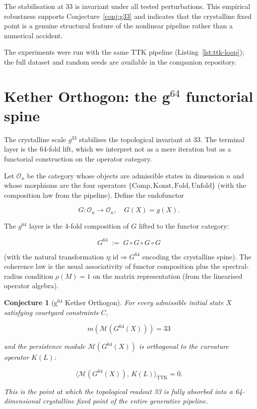 \documentclass[12pt, oneside]{book}
\theoremstyle{plain}
\newtheorem{conjecture}[theorem]{Conjecture}
\theoremstyle{definition}
\theoremstyle{remark}
\begin{document}
The stabilisation at 33 is invariant under all tested perturbations. This empirical robustness supports Conjecture~\ref{conj:g33} and indicates that the crystalline fixed point is a genuine structural feature of the nonlinear pipeline rather than a numerical accident.

The experiments were run with the same TTK pipeline (Listing~\ref{lst:ttk-loop}); the full dataset and random seeds are available in the companion repository.

\section{Kether Orthogon: the g\texorpdfstring{$^{64}$}{64} functorial spine}
\label{sec:g64}

The crystalline scale \(g^{33}\) stabilises the topological invariant at 33. The terminal layer is the 64-fold lift, which we interpret not as a mere iteration but as a functorial construction on the operator category.

Let \(\mathcal{O}_n\) be the category whose objects are admissible states in dimension \(n\) and whose morphisms are the four operators \(\{\text{Comp}, \text{Konst}, \text{Fold}, \text{Unfold}\}\) (with the composition law from the pipeline). Define the endofunctor


\[
G \colon \mathcal{O}_n \to \mathcal{O}_n, \quad G(X) = g(X).
\]



The \(g^{64}\) layer is the 4-fold composition of \(G\) lifted to the functor category:


\[
G^{64} \;:=\; G \circ G \circ G \circ G
\]


(with the natural transformation \(\eta \colon \mathrm{id} \Rightarrow G^{64}\) encoding the crystalline spine). The coherence law is the usual associativity of functor composition plus the spectral-radius condition \(\rho(M) = 1\) on the matrix representation (from the linearised operator algebra).

\begin{conjecture}[g\texorpdfstring{$^{64}$}{64} Kether Orthogon]
\label{conj:g64}
For every admissible initial state \(X\) satisfying courtyard constraints \(C\),


\[
m(\mathcal{M}(G^{64}(X))) = 33
\]


and the persistence module \(\mathcal{M}(G^{64}(X))\) is orthogonal to the curvature operator \(K(L)\):


\[
\langle \mathcal{M}(G^{64}(X)),\, K(L) \rangle_{\text{TTK}} = 0.
\]


This is the point at which the topological readout 33 is fully absorbed into a 64-dimensional crystalline fixed point of the entire generative pipeline.
\end{conjecture}
\end{document}
